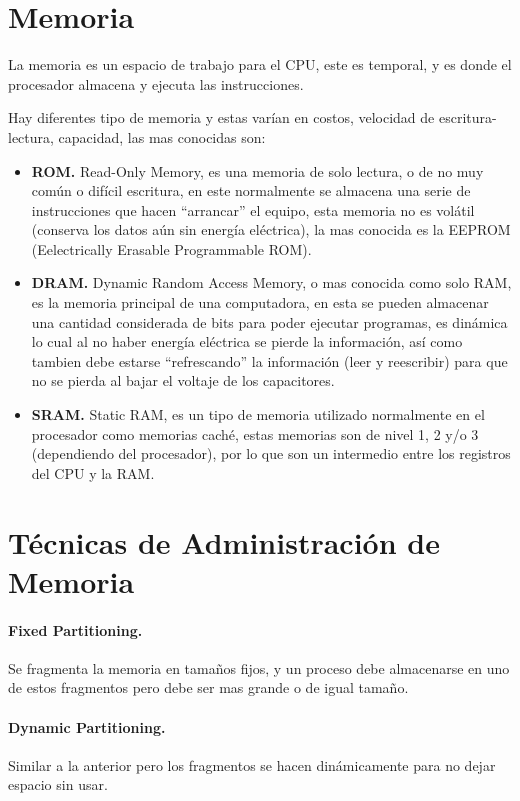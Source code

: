\documentclass[spanish,12pt,letterpapper]{article}
\begin{document}
	\section{Memoria}
	La memoria es un espacio de trabajo para el CPU, este es temporal, y es donde el procesador almacena y ejecuta las instrucciones.
	
	Hay diferentes tipo de memoria y estas varían en costos, velocidad de escritura-lectura, capacidad, las mas conocidas son:
	
	\begin{itemize}
	\item \textbf{ROM.} Read-Only Memory, es una memoria de solo lectura, o de no muy común o difícil escritura, en este normalmente se almacena una serie de instrucciones que hacen ``arrancar'' el equipo, esta memoria no es volátil (conserva los datos aún sin energía eléctrica), la mas conocida es la EEPROM (Eelectrically Erasable Programmable ROM).
	
	\item \textbf{DRAM.} Dynamic Random Access Memory, o mas conocida como solo RAM, es la memoria principal de una computadora, en esta se pueden almacenar una cantidad considerada de bits para poder ejecutar programas, es dinámica lo cual al no haber energía eléctrica se pierde la información, así como tambien debe estarse ``refrescando'' la información (leer y reescribir) para que no se pierda al bajar el voltaje de los capacitores.
	
	\item \textbf{SRAM.} Static RAM, es un tipo de memoria utilizado normalmente en el procesador como memorias caché, estas memorias son de nivel 1, 2 y/o 3 (dependiendo del procesador), por lo que son un intermedio entre los registros del CPU y la RAM.
    \end{itemize}	 
	
	\section{Técnicas de Administración de Memoria}
	\paragraph{Fixed Partitioning.} Se fragmenta la memoria en tamaños fijos, y un proceso debe almacenarse en uno de estos fragmentos pero debe ser mas grande o de igual tamaño.
	
	\paragraph{Dynamic Partitioning.} Similar a la anterior pero los fragmentos se hacen dinámicamente para no dejar espacio sin usar.
	
\end{document}
